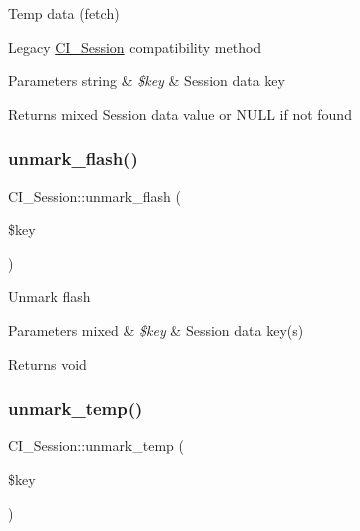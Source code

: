 Temp data (fetch)

Legacy \mbox{\hyperlink{class_c_i___session}{C\+I\+\_\+\+Session}} compatibility method


\begin{DoxyParams}[1]{Parameters}
string & {\em \$key} & Session data key \\
\hline
\end{DoxyParams}
\begin{DoxyReturn}{Returns}
mixed Session data value or N\+U\+LL if not found 
\end{DoxyReturn}
\mbox{\label{class_c_i___session_af333087c7f191878e19c15fd98f5e301}} 
\subsubsection{\texorpdfstring{unmark\+\_\+flash()}{unmark\_flash()}}
{\footnotesize\ttfamily C\+I\+\_\+\+Session\+::unmark\+\_\+flash (\begin{DoxyParamCaption}\item[{}]{\$key }\end{DoxyParamCaption})}

Unmark flash


\begin{DoxyParams}[1]{Parameters}
mixed & {\em \$key} & Session data key(s) \\
\hline
\end{DoxyParams}
\begin{DoxyReturn}{Returns}
void 
\end{DoxyReturn}
\mbox{\label{class_c_i___session_a3ab507f83d222d336d1878aeef505e2b}} 
\subsubsection{\texorpdfstring{unmark\+\_\+temp()}{unmark\_temp()}}
{\footnotesize\ttfamily C\+I\+\_\+\+Session\+::unmark\+\_\+temp (\begin{DoxyParamCaption}\item[{}]{\$key }\end{DoxyParamCaption})}

